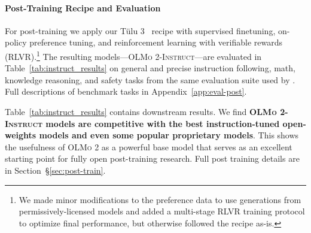\documentclass[table]{ai2style/ai2}
\newcommand{\tulu}{T\"ulu 3\xspace}
\newcommand{\olmotoo}{\textsc{OLMo 2}\xspace}
\newcommand{\olmotooinstruct}{\textsc{OLMo 2-Instruct}\xspace}
\begin{document}
\paragraph{Post-Training Recipe and Evaluation}
\label{sec:adapt-eval}
For post-training we apply our \tulu~\citep{lambert2024tulu3} recipe with supervised finetuning, on-policy preference tuning, and reinforcement learning with verifiable rewards (RLVR).\footnote{
We made minor modifications to the preference data to use generations from permissively-licensed models and added a multi-stage RLVR training protocol to optimize final performance, but otherwise followed the recipe as-is. 
}
The resulting models---\olmotooinstruct---are evaluated in Table~\ref{tab:instruct_results} on general and precise instruction following, math, knowledge reasoning, and safety tasks from the same evaluation suite used by \citet{lambert2024tulu3}.
Full descriptions of benchmark tasks in Appendix~\ref{app:eval-post}.

Table~\ref{tab:instruct_results} contains downstream results.
We find \textbf{\olmotooinstruct models are competitive with the best instruction-tuned open-weights models and even some popular proprietary models}.
This shows the usefulness of \olmotoo as a powerful base model that serves as an excellent starting point for fully open post-training research.
Full post training details are in Section~\S\ref{sec:post-train}.
\end{document}

